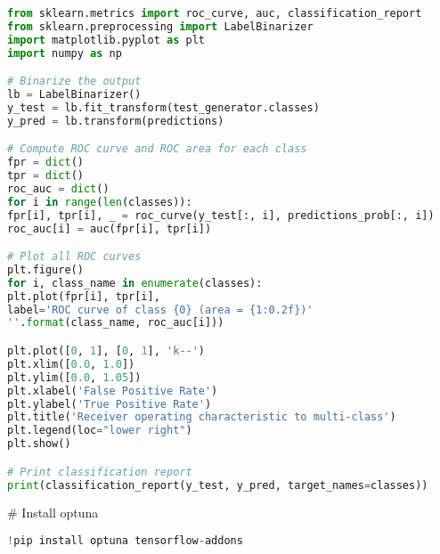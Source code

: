 \begin{lstlisting}[language=Python]
from sklearn.metrics import roc_curve, auc, classification_report
from sklearn.preprocessing import LabelBinarizer
import matplotlib.pyplot as plt
import numpy as np

# Binarize the output
lb = LabelBinarizer()
y_test = lb.fit_transform(test_generator.classes)
y_pred = lb.transform(predictions)

# Compute ROC curve and ROC area for each class
fpr = dict()
tpr = dict()
roc_auc = dict()
for i in range(len(classes)):
fpr[i], tpr[i], _ = roc_curve(y_test[:, i], predictions_prob[:, i])
roc_auc[i] = auc(fpr[i], tpr[i])

# Plot all ROC curves
plt.figure()
for i, class_name in enumerate(classes):
plt.plot(fpr[i], tpr[i],
label='ROC curve of class {0} (area = {1:0.2f})'
''.format(class_name, roc_auc[i]))

plt.plot([0, 1], [0, 1], 'k--')
plt.xlim([0.0, 1.0])
plt.ylim([0.0, 1.05])
plt.xlabel('False Positive Rate')
plt.ylabel('True Positive Rate')
plt.title('Receiver operating characteristic to multi-class')
plt.legend(loc="lower right")
plt.show()

# Print classification report
print(classification_report(y_test, y_pred, target_names=classes))
\end{lstlisting}

# Install optuna
\begin{lstlisting}[language=Python]
!pip install optuna tensorflow-addons
\end{lstlisting}

